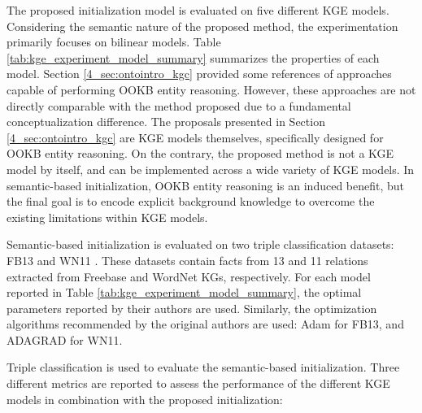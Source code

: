 The proposed initialization model is evaluated on five different KGE models. Considering the semantic nature of the proposed method, the experimentation primarily focuses on bilinear models. Table \ref{tab:kge_experiment_model_summary} summarizes the properties of each model. Section \ref{4_sec:ontointro_kgc} provided some references of approaches capable of performing OOKB entity reasoning. However, these approaches are not directly comparable with the method proposed due to a fundamental conceptualization difference. The proposals presented in Section \ref{4_sec:ontointro_kgc} are KGE models themselves, specifically designed for OOKB entity reasoning. On the contrary, the proposed method is not a KGE model by itself, and can be implemented across a wide variety of KGE models. In semantic-based initialization, OOKB entity reasoning is an induced benefit, but the final goal is to encode explicit background knowledge to overcome the existing limitations within KGE models.

Semantic-based initialization is evaluated on two triple classification datasets: FB13 \citep{neuraltensornetwork,Bollacker:2008:FCC:1376616.1376746} and WN11 \citep{Miller95wordnet:a}. These datasets contain facts from 13 and 11 relations extracted from Freebase and WordNet KGs, respectively. For each model reported in Table \ref{tab:kge_experiment_model_summary}, the optimal parameters reported by their authors are used. Similarly, the optimization algorithms recommended by the original authors are used: Adam \cite{adam} for FB13, and ADAGRAD \cite{adagrad} for WN11.

Triple classification is used to evaluate  the semantic-based initialization. Three different metrics are reported to assess the performance of the different KGE models in combination with the proposed initialization:

